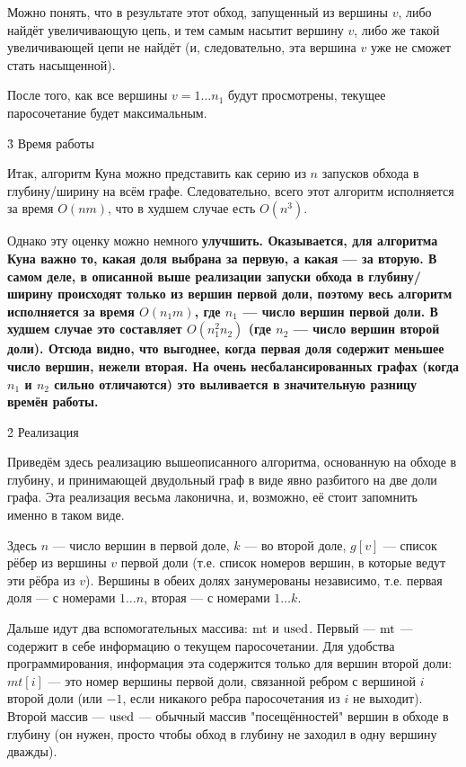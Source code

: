 Можно понять, что в результате этот обход, запущенный из вершины $v$, либо найдёт увеличивающую цепь, и тем самым насытит вершину $v$, либо же такой увеличивающей цепи не найдёт (и, следовательно, эта вершина $v$ уже не сможет стать насыщенной).

После того, как все вершины $v = 1 \ldots n_1$ будут просмотрены, текущее паросочетание будет максимальным.


\h3{ Время работы }

Итак, алгоритм Куна можно представить как серию из $n$ запусков обхода в глубину/ширину на всём графе. Следовательно, всего этот алгоритм исполняется за время $O (n m)$, что в худшем случае есть $O (n^3)$.

Однако эту оценку можно немного \bf{улучшить}. Оказывается, для алгоритма Куна важно то, какая доля выбрана за первую, а какая --- за вторую. В самом деле, в описанной выше реализации запуски обхода в глубину/ширину происходят только из вершин первой доли, поэтому весь алгоритм исполняется за время $O (n_1 m)$, где $n_1$ --- число вершин первой доли. В худшем случае это составляет $O (n_1^2 n_2)$ (где $n_2$ --- число вершин второй доли). Отсюда видно, что выгоднее, когда первая доля содержит меньшее число вершин, нежели вторая. На очень несбалансированных графах (когда $n_1$ и $n_2$ сильно отличаются) это выливается в значительную разницу времён работы.


\h2{ Реализация }

Приведём здесь реализацию вышеописанного алгоритма, основанную на обходе в глубину, и принимающей двудольный граф в виде явно разбитого на две доли графа. Эта реализация весьма лаконична, и, возможно, её стоит запомнить именно в таком виде.

Здесь $n$ --- число вершин в первой доле, $k$ --- во второй доле, $g[v]$ --- список рёбер из вершины $v$ первой доли (т.е. список номеров вершин, в которые ведут эти рёбра из $v$). Вершины в обеих долях занумерованы независимо, т.е. первая доля --- с номерами $1 \ldots n$, вторая --- с номерами $1 \ldots k$.

Дальше идут два вспомогательных массива: $\rm mt$ и $\rm used$. Первый --- $\rm mt$ --- содержит в себе информацию о текущем паросочетании. Для удобства программирования, информация эта содержится только для вершин второй доли: $mt[i]$ --- это номер вершины первой доли, связанной ребром с вершиной $i$ второй доли (или $-1$, если никакого ребра паросочетания из $i$ не выходит). Второй массив --- $\rm used$ --- обычный массив "посещённостей" вершин в обходе в глубину (он нужен, просто чтобы обход в глубину не заходил в одну вершину дважды).

